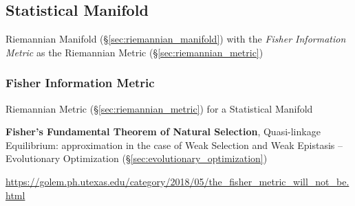 \subsection{Statistical Manifold}\label{sec:statistical_manifold}

Riemannian Manifold (\S\ref{sec:riemannian_manifold}) with the
\emph{Fisher Information Metric} as the Riemannian Metric
(\S\ref{sec:riemannian_metric})



\subsubsection{Fisher Information Metric}\label{sec:fisher_metric}

Riemannian Metric (\S\ref{sec:riemannian_metric}) for a Statistical
Manifold

\fist \textbf{Fisher's Fundamental Theorem of Natural Selection},
Quasi-linkage Equilibrium: approximation in the case of Weak Selection
and Weak Epistasis -- Evolutionary Optimization
(\S\ref{sec:evolutionary_optimization}) %

\url{https://golem.ph.utexas.edu/category/2018/05/the_fisher_metric_will_not_be.html}
